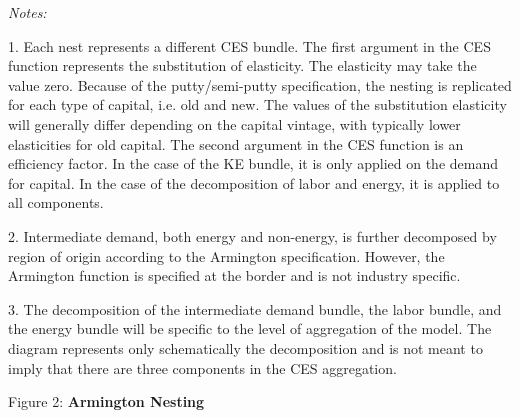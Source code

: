 \documentclass[12pt]{article}
\begin{document}
\textit{Notes:}
\begin{footnotesize}

1.\hspace{10pt} Each nest represents a different CES bundle. The first argument in the CES function represents the substitution of elasticity. The elasticity may take the value zero. Because of the putty/semi-putty specification, the nesting is replicated for each type of capital, i.e. old and new. The values of the substitution elasticity will generally differ depending on the capital vintage, with typically lower elasticities for old capital. The second argument in the CES function is an efficiency factor. In the case of the KE bundle, it is only applied on the demand for capital. In the case of the decomposition of labor and energy, it is applied to all components.

2.\hspace{10pt} Intermediate demand, both energy and non-energy, is further decomposed by region of origin according to the Armington specification. However, the Armington function is specified at the border and is not industry specific.

3.\hspace{10pt} The decomposition of the intermediate demand bundle, the labor bundle, and the energy bundle will be specific to the level of aggregation of the model. The diagram represents only schematically the decomposition and is not meant to imply that there are three components in the CES aggregation.

\end{footnotesize}


\begin{center}

Figure 2: \textbf{Armington Nesting}

\vspace{20pt}
\begin{scriptsize}
\end{scriptsize}
\end{center}
\end{document}
